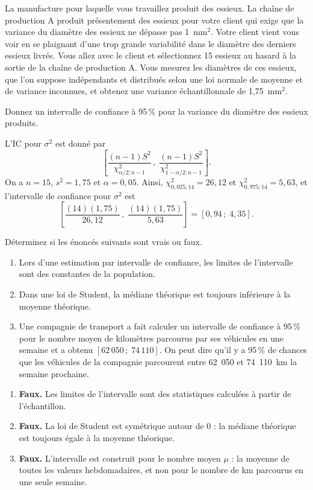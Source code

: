 \begin{exercice}\label{exo:essieux}
La manufacture pour laquelle vous travaillez produit des essieux. La chaîne de production A
produit présentement des essieux pour votre client qui exige que la variance du diamètre des
essieux ne dépasse pas 1~mm$^2$. Votre client vient vous voir en se plaignant d'une trop
grande variabilité dans le diamètre des derniers essieux livrés. Vous allez avec le client et
sélectionnez 15 essieux au hasard à la sortie de la chaîne de production A. Vous mesurez les
diamètres de ces essieux, que l'on suppose indépendants et distribués selon une loi normale
de moyenne et de variance inconnues, et obtenez une variance échantillonnale de 1,75~mm$^2$.

Donnez un intervalle de confiance à 95\,\% pour la variance du diamètre des essieux produits.
\begin{solution}
L'IC pour $\sigma^2$ est donné par
\[
  \left[\frac{(n-1)S^2}{\chi^2_{\alpha/2;n-1}}\,,\;
  \frac{(n-1)S^2}{\chi^2_{1-\alpha/2;n-1}}\right].
\]
On a $n=15$, $s^2=1,75$ et $\alpha=0,05$. Ainsi,
$\chi^2_{0,025;14}=26,12$ et $\chi^2_{0,975;14}=5,63$, et l'intervalle de confiance pour
$\sigma^2$ est
\[
  \left[\frac{(14)(1,75)}{26,12}\,,\;\frac{(14)(1,75)}{5,63}\right]=[0,94\,;\;4,35].
\]
\end{solution}
\end{exercice}

\begin{exercice}
Déterminez si les énoncés suivants sont vrais ou faux.
\begin{enumerate}[label=(\alph*)]
  \item Lors d'une estimation par intervalle de confiance, les limites de l'intervalle sont
  des constantes de la population.
  \item Dans une loi de Student, la médiane théorique est toujours inférieure à la moyenne
  théorique.
  \item Une compagnie de transport a fait calculer un intervalle de confiance à 95\,\% pour
  le nombre moyen de kilomètres parcourus par ses véhicules en une semaine et a obtenu
  $[62\,050\,;\;74\,110]$. On peut dire qu'il y a 95\,\% de chances que les véhicules de la
  compagnie parcourent entre 62~050 et 74~110~km la semaine prochaine.
\end{enumerate}
\begin{solution}
\begin{enumerate}[label=(\alph*)]
  \item \textbf{Faux.} Les limites de l'intervalle sont des statistiques calculées à partir
  de l'échantillon.
  \item \textbf{Faux.} La loi de Student est symétrique autour de 0 : la médiane théorique
  est toujours égale à la moyenne théorique.
  \item \textbf{Faux.} L'intervalle est construit pour le nombre moyen $\mu$ : la moyenne de
  toutes les valeurs hebdomadaires, et non pour le nombre de km parcourus en une seule
  semaine.
\end{enumerate}
\end{solution}
\end{exercice}

